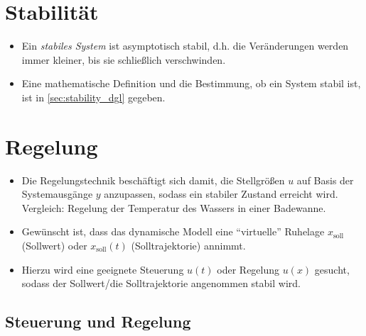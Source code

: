 \documentclass[a4paper, 11pt, accentcolor = tud3b]{tudreport}
\begin{document}
        \section{Stabilität} %
	        \begin{itemize}
	        	\item Ein \textit{stabiles System} ist asymptotisch stabil, d.h. die Veränderungen werden immer kleiner, bis sie schließlich verschwinden.
	        	\item Eine mathematische Definition und die Bestimmung, ob ein System stabil ist, ist in \ref{sec:stability_dgl} gegeben.
	        \end{itemize}

        \section{Regelung} %
            \begin{itemize}
            	\item Die Regelungstechnik beschäftigt sich damit, die Stellgrößen \(u\) auf Basis der Systemausgänge \(y\) anzupassen, sodass ein stabiler Zustand erreicht wird. \\ Vergleich: Regelung der Temperatur des Wassers in einer Badewanne.
            	\item Gewünscht ist, dass das dynamische Modell eine \enquote{virtuelle} Ruhelage \(x_\text{soll}\) (Sollwert) oder \(x_\text{soll} (t)\) (Solltrajektorie) annimmt.
            	\item Hierzu wird eine geeignete Steuerung \(u(t)\) oder Regelung \(u(x)\) gesucht, sodass der Sollwert/die Solltrajektorie angenommen stabil wird.
            \end{itemize}

            \subsection{Steuerung und Regelung} %
\end{document}
